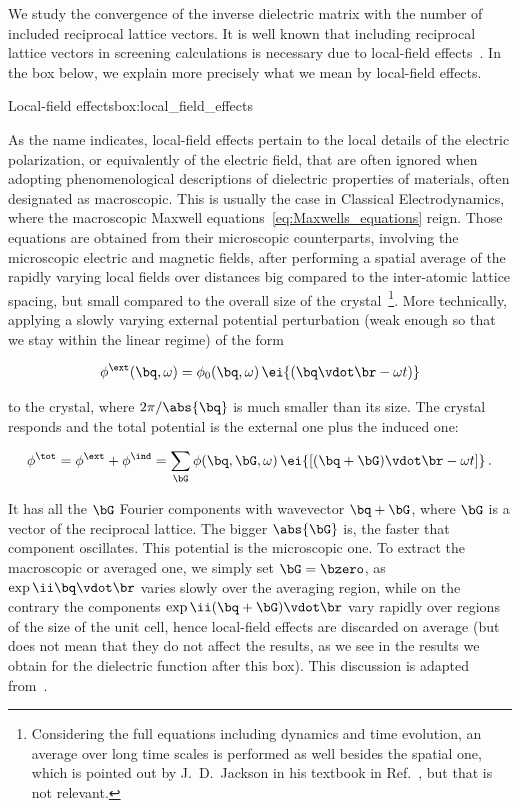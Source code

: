 We study the convergence of the inverse dielectric matrix with the number of included reciprocal lattice vectors.
It is well known that including reciprocal lattice vectors in screening calculations is necessary due to local-field effects~\cite{Adler_1962,Wiser_1963}.
In the box below, we explain more precisely what we mean by local-field effects.

\begin{mybox}{Local-field effects}{box:local_field_effects}

As the name indicates, local-field effects pertain to the local details of the electric polarization, or equivalently of the electric field, that are often ignored when adopting phenomenological descriptions of dielectric properties of materials, often designated as macroscopic.
This is usually the case in Classical Electrodynamics, where the macroscopic Maxwell equations~\eqref{eq:Maxwells_equations} reign.
Those equations are obtained from their microscopic counterparts, involving the microscopic electric and magnetic fields, after performing a spatial average of the rapidly varying local fields over distances big compared to the inter-atomic lattice spacing, but small compared to the overall size of the crystal~\footnote{Considering the full equations including dynamics and time evolution, an average over long time scales is performed as well besides the spatial one, which is pointed out by J.~D.~Jackson in his textbook in Ref.~\cite{Jackson:electrodynamics}, but that is not relevant.}.
More technically, applying a slowly varying external potential perturbation (weak enough so that we stay within the linear regime) of the form

\begin{equation}
    \phi^{\ext}(\bq,\omega) = \phi_0(\bq,\omega) \, \ei{(\bq \vdot \br - \omega t)}
\end{equation}

\noindent to the crystal, where $2\pi/\abs{\bq}$ is much smaller than its size.
The crystal responds and the total potential is the external one plus the induced one:

\begin{equation}
    \phi^{\tot} = \phi^{\ext} + \phi^{\ind} = \sum_{\bG} \phi(\bq,\bG,\omega) \, \ei{[(\bq + \bG) \vdot \br - \omega t]}\,.
\end{equation}

It has all the $\bG$ Fourier components with wavevector $\bq + \bG$, where $\bG$ is a vector of the reciprocal lattice.
The bigger $\abs{\bG}$ is, the faster that component oscillates.
This potential is the microscopic one.
To extract the macroscopic or averaged one, we simply set $\bG = \bzero$, as $\exp{\ii \bq \vdot \br}$ varies slowly over the averaging region, while on the contrary the components $\exp{\ii (\bq + \bG) \vdot \br}$ vary rapidly over regions of the size of the unit cell, hence local-field effects are discarded on average (but does not mean that they do not affect the results, as we see in the results we obtain for the dielectric function after this box).
This discussion is adapted from~\cite{Adler_1962}.
\end{mybox}

